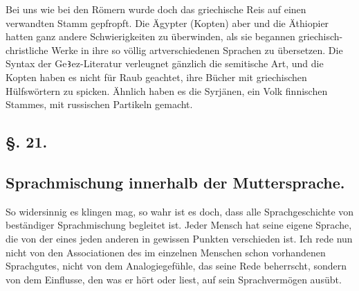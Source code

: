 {Bei uns wie bei den Römern wurde doch das griechische Reis auf einen verwandten Stamm gepfropft. Die Ägypter (Kopten) aber und die Äthiopier hatten ganz andere Schwierigkeiten zu überwinden, als sie begannen griechisch-christliche Werke in ihre so völlig artverschiedenen Sprachen zu übersetzen. Die Syntax der Ge\texttt{Ꜣ}ez-Literatur verleugnet gänzlich die semitische Art, und die Kopten haben es nicht für Raub geachtet, ihre Bücher mit griechischen Hülfs\-\label{sp.273}wör\-tern zu spicken. Ähnlich haben es die Syrjänen, ein Volk finnischen Stammes, mit russischen Partikeln gemacht. 

\label{fp.267}

\subsection*{§. 21.}\label{III.II.II.21}
\subsection*{Sprachmischung innerhalb der Muttersprache.}
So widersinnig es klingen mag, so wahr ist es doch, dass alle Sprachgeschichte von beständiger Sprachmischung begleitet ist. Jeder Mensch hat seine eigene Sprache, die von der eines jeden anderen in gewissen Punkten verschieden ist. Ich rede nun nicht von den Associationen des im einzelnen Menschen schon vorhandenen Sprachgutes, nicht von dem Analogiegefühle, das seine Rede beherrscht, sondern von dem Einflusse, den  was er hört oder liest, auf sein Sprachvermögen ausübt.

}
